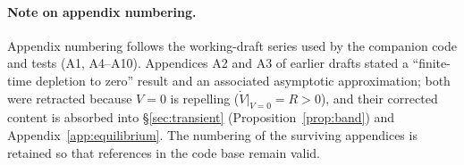\documentclass[11pt,a4paper]{article}
\theoremstyle{definition}
\theoremstyle{remark}
\numberwithin{equation}{section}
\begin{document}
\clearpage
\appendix
\renewcommand{\thesection}{A\arabic{section}}
\setcounter{section}{0}
\setcounter{table}{0}
\renewcommand{\thetable}{A\arabic{table}}
\setcounter{figure}{0}
\renewcommand{\thefigure}{A\arabic{figure}}

\paragraph{Note on appendix numbering.}
Appendix numbering follows the working-draft series used by the companion
code and tests (A1, A4--A10). Appendices A2 and A3 of earlier drafts stated a
``finite-time depletion to zero'' result and an associated asymptotic
approximation; both were retracted because $V=0$ is repelling
($\dot V|_{V=0}=R>0$), and their corrected content is absorbed into
\S\ref{sec:transient} (Proposition~\ref{prop:band}) and
Appendix~\ref{app:equilibrium}. The numbering of the surviving appendices is
retained so that references in the code base remain valid.


\setcounter{section}{3}%









\clearpage


\end{document}
